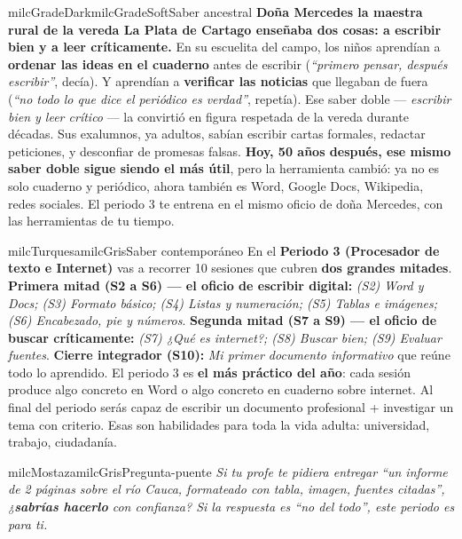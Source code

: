 \documentclass[11pt,letterpaper]{article}
\begin{document}
\begin{softbox}{milcGradeDark}{milcGradeSoft}{Saber ancestral}
\textbf{Doña Mercedes la maestra rural de la vereda La Plata de Cartago enseñaba dos cosas: a escribir bien y a leer críticamente.} En su escuelita del campo, los niños aprendían a \textbf{ordenar las ideas en el cuaderno} antes de escribir (\emph{``primero pensar, después escribir''}, decía). Y aprendían a \textbf{verificar las noticias} que llegaban de fuera (\emph{``no todo lo que dice el periódico es verdad''}, repetía). Ese saber doble --- \emph{escribir bien y leer crítico} --- la convirtió en figura respetada de la vereda durante décadas. Sus exalumnos, ya adultos, sabían escribir cartas formales, redactar peticiones, y desconfiar de promesas falsas. \textbf{Hoy, 50 años después, ese mismo saber doble sigue siendo el más útil}, pero la herramienta cambió: ya no es solo cuaderno y periódico, ahora también es Word, Google Docs, Wikipedia, redes sociales. El periodo 3 te entrena en el mismo oficio de doña Mercedes, con las herramientas de tu tiempo.
\end{softbox}

\begin{softbox}{milcTurquesa}{milcGris}{Saber contemporáneo}
En el \textbf{Periodo 3 (Procesador de texto e Internet)} vas a recorrer 10 sesiones que cubren \textbf{dos grandes mitades}. \textbf{Primera mitad (S2 a S6) --- el oficio de escribir digital:} \emph{(S2) Word y Docs; (S3) Formato básico; (S4) Listas y numeración; (S5) Tablas e imágenes; (S6) Encabezado, pie y números}. \textbf{Segunda mitad (S7 a S9) --- el oficio de buscar críticamente:} \emph{(S7) ¿Qué es internet?; (S8) Buscar bien; (S9) Evaluar fuentes}. \textbf{Cierre integrador (S10):} \emph{Mi primer documento informativo} que reúne todo lo aprendido. El periodo 3 es \textbf{el más práctico del año}: cada sesión produce algo concreto en Word o algo concreto en cuaderno sobre internet. Al final del periodo serás capaz de escribir un documento profesional + investigar un tema con criterio. Esas son habilidades para toda la vida adulta: universidad, trabajo, ciudadanía.
\end{softbox}

\begin{softbox}{milcMostaza}{milcGris}{Pregunta-puente}
\textit{Si tu profe te pidiera entregar \emph{``un informe de 2 páginas sobre el río Cauca, formateado con tabla, imagen, fuentes citadas''}, ¿\textbf{sabrías hacerlo} con confianza? Si la respuesta es \emph{``no del todo''}, este periodo es para ti.}
\end{softbox}
\end{document}
